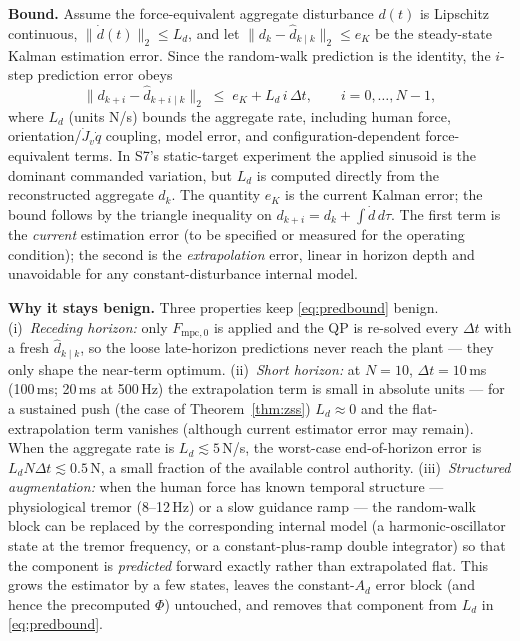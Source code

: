 \documentclass[journal]{IEEEtran}
\newcommand{\Fmpck}[1]{F_{\text{mpc},#1}}
\newcommand{\dhat}{\hat{d}}
\begin{document}
\textbf{Bound.} Assume the force-equivalent aggregate disturbance $d(t)$ is
Lipschitz continuous,
$\|\dot{d}(t)\|_2\le L_d$, and let $\|d_k-\dhat_{k\mid k}\|_2\le e_K$ be the
steady-state Kalman estimation error. Since the random-walk prediction is the
identity, the $i$-step prediction error obeys
\begin{equation}\label{eq:predbound}
  \|d_{k+i}-\dhat_{k+i\mid k}\|_2 \;\le\; e_K + L_d\,i\,\Delta t,
  \qquad i=0,\dots,N-1,
\end{equation}
where $L_d$ (units N/s) bounds the aggregate rate, including human force,
orientation/$\dot J_v\dot q$ coupling, model error, and configuration-dependent
force-equivalent terms. In S7's static-target experiment the applied sinusoid
is the dominant commanded variation, but $L_d$ is computed directly from the
reconstructed aggregate $d_k$. The quantity $e_K$ is the current Kalman error; the bound
follows by the triangle inequality on $d_{k+i}=d_k+\int\dot{d}\,d\tau$. The
first term is the \emph{current} estimation error (to be specified or
measured for the operating condition); the second is the \emph{extrapolation}
error, linear in horizon depth and unavoidable for any constant-disturbance
internal model.

\textbf{Why it stays benign.} Three properties keep
\eqref{eq:predbound} benign. (i)~\emph{Receding horizon:} only $\Fmpck{0}$ is
applied and the QP is re-solved every $\Delta t$ with a fresh
$\dhat_{k\mid k}$, so the loose late-horizon predictions never reach the plant
--- they only shape the near-term optimum. (ii)~\emph{Short horizon:} at
$N=10$, $\Delta t=10$\,ms (100\,ms; 20\,ms at 500\,Hz) the extrapolation term
is small in absolute units --- for a sustained push (the case of
Theorem~\ref{thm:zss}) $L_d\approx0$ and the flat-extrapolation term vanishes
(although current estimator error may remain). When the aggregate rate is
$L_d\lesssim5$\,N/s, the worst-case end-of-horizon error is
$L_d N\Delta t\lesssim0.5$\,N, a small fraction of the
available control authority. (iii)~\emph{Structured augmentation:} when the
human force has known temporal structure --- physiological tremor
(8--12\,Hz) or a slow guidance ramp --- the random-walk block can be replaced
by the corresponding internal model (a harmonic-oscillator state at the tremor
frequency, or a constant-plus-ramp double integrator) so that the component is
\emph{predicted} forward exactly rather than extrapolated flat. This grows the
estimator by a few states, leaves the constant-$A_d$ error block (and hence
the precomputed $\Phi$) untouched, and removes that component from $L_d$ in
\eqref{eq:predbound}.
\end{document}
